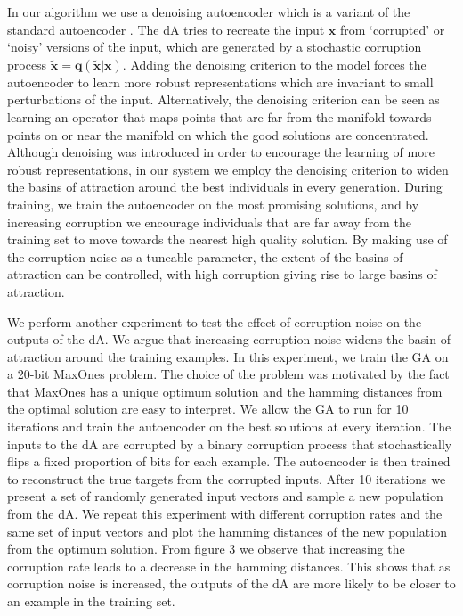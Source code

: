 \documentclass[twoside]{article}
\begin{document}
In our algorithm we use a denoising autoencoder which is a variant of the standard autoencoder \cite{vincent2008extracting}. The dA tries to recreate the input $\mathbf x$ from `corrupted' or `noisy' versions of the input, which are generated by a stochastic corruption process $\mathbf{\tilde x = q(\tilde x|x)}$. Adding the denoising criterion to the model forces the autoencoder to learn more robust representations which are invariant to small perturbations of the input. Alternatively, the denoising criterion can be seen as learning an operator that maps points that are far from the manifold towards points on or near the manifold on which the good solutions are concentrated. Although denoising was introduced in order to encourage the learning of more robust representations, in our system we employ the denoising criterion to widen the basins of attraction around the best individuals in every generation. During training, we train the autoencoder on the most promising solutions, and by increasing corruption we encourage individuals that are far away from the training set to move towards the nearest high quality solution. By making use of the corruption noise as a tuneable parameter, the extent of the basins of attraction can be controlled, with high corruption giving rise to large basins of attraction.

We perform another experiment to test the effect of corruption noise on the outputs of the dA. We argue that increasing corruption noise widens the basin of attraction around the training examples. In this experiment, we train the GA on a 20-bit MaxOnes problem. The choice of the problem was motivated by the fact that MaxOnes has a unique optimum solution and the hamming distances from the optimal solution are easy to interpret. We allow the GA to run for 10 iterations and train the autoencoder on the best solutions at every iteration. The inputs to the dA are corrupted by a binary corruption process that stochastically flips a fixed proportion of bits for each example. The autoencoder is then trained to reconstruct the true targets from the corrupted inputs. After 10 iterations we present a set of randomly generated input vectors and sample a new population from the dA. We repeat this experiment with different corruption rates and the same set of input vectors and  plot the hamming distances of the new population from the optimum solution. From figure 3 we observe that increasing the corruption rate leads to a decrease in the hamming distances. This shows that as corruption noise is increased, the outputs of the dA are more likely to be closer to an example in the training set.
\end{document}
